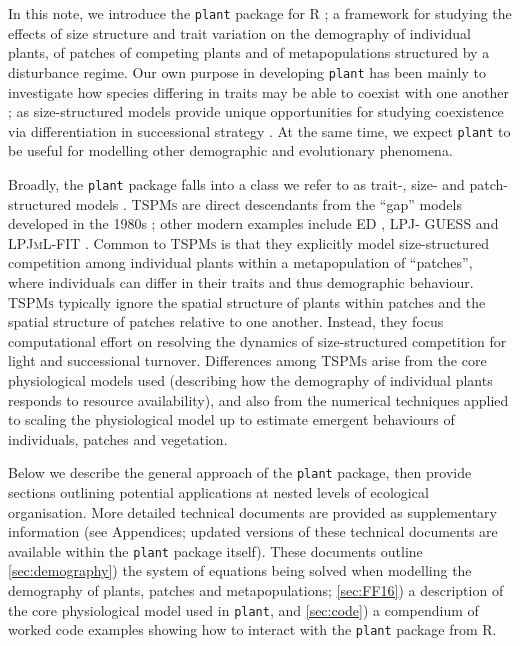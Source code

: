 \documentclass[a4paper,11pt]{article}
\newcommand{\plant}{\texttt{plant}}
\begin{document}
In this note, we introduce the {\plant} package for R \citep{R-2015};
a framework for studying the effects of size structure and
trait variation on the demography of individual plants, of patches of
competing plants and of metapopulations structured by a
disturbance regime.
%
Our own purpose in developing {\plant} has been mainly to investigate how species
differing in traits may be able to coexist with one another
\citep[following ][]{Falster-2011, Falster-2015}; as size-structured models
provide unique opportunities for studying coexistence via differentiation in
successional strategy \citep[see also][]{Huston-1987, Moorcroft-2001}.
At the same time, we expect {\plant} to be useful for modelling other demographic and evolutionary phenomena.

Broadly, the {\plant} package falls into a class we refer to as trait-, size- and
patch-structured models \citep[\textsc{TSPMs}, following][]{Falster-2011}. \textsc{TSPMs} are direct
descendants from the ``gap'' models developed in the 1980s
\citep[e.g.,][]{Shugart-1980, Huston-1987, Kohyama-1993}; other modern examples
include \textsc{ED} \citep{Moorcroft-2001}, \textsc{LPJ- GUESS}
\citep{Smith-2014} and \textsc{LPJmL-FIT} \citep{Sakschewski-2015}. Common to
\textsc{TSPMs} is that they explicitly model size-structured competition
among individual plants within a metapopulation of ``patches'', where
individuals can differ in their traits and thus demographic behaviour.
\textsc {TSPMs} typically ignore the spatial structure of plants within
patches and the spatial structure of patches relative to one another. Instead,
they focus computational effort on resolving the dynamics of size-structured
competition for light and successional turnover. Differences among
\textsc{TSPMs} arise from the core physiological models used (describing
how the demography of individual plants responds to resource availability),
and also from the numerical techniques applied to scaling the physiological model
up to estimate emergent behaviours of individuals, patches and vegetation.

Below we describe the general approach of the {\plant} package, then provide
sections outlining potential applications at nested levels of ecological organisation.
More detailed technical documents are provided as supplementary information
(see Appendices; updated versions of these technical documents are
available within the {\plant} package itself). These documents outline \ref{sec:demography}) the system of
equations being solved when modelling the demography of plants, patches and metapopulations; \ref{sec:FF16}) a description of the core
physiological model used in {\plant}, and \ref{sec:code}) a compendium of worked code examples showing how to interact with the {\plant} package from R.
\end{document}
